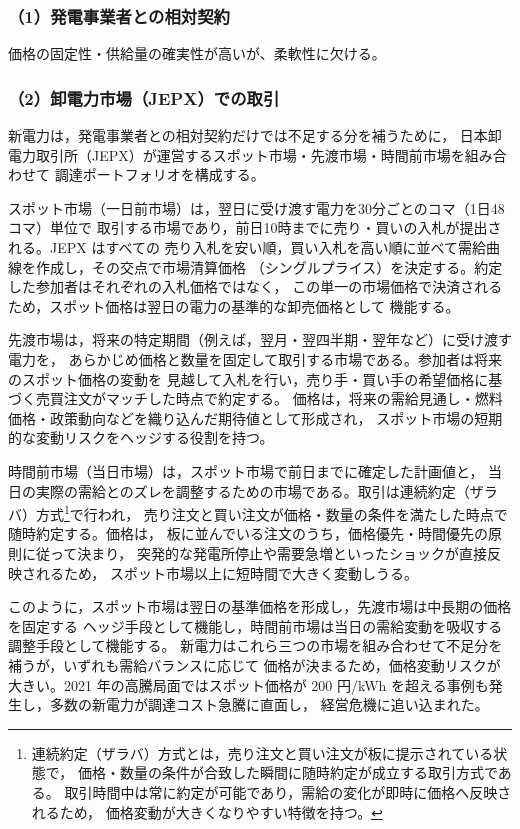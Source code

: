\subsubsection{（1）発電事業者との相対契約}

価格の固定性・供給量の確実性が高いが、柔軟性に欠ける。

\subsubsection{（2）卸電力市場（JEPX）での取引}

新電力は，発電事業者との相対契約だけでは不足する分を補うために，
日本卸電力取引所（JEPX）が運営するスポット市場・先渡市場・時間前市場を組み合わせて
調達ポートフォリオを構成する。

スポット市場（一日前市場）は，翌日に受け渡す電力を30分ごとのコマ（1日48コマ）単位で
取引する市場であり，前日10時までに売り・買いの入札が提出される。JEPX はすべての
売り入札を安い順，買い入札を高い順に並べて需給曲線を作成し，その交点で市場清算価格
（シングルプライス）を決定する。約定した参加者はそれぞれの入札価格ではなく，
この単一の市場価格で決済されるため，スポット価格は翌日の電力の基準的な卸売価格として
機能する。

先渡市場は，将来の特定期間（例えば，翌月・翌四半期・翌年など）に受け渡す電力を，
あらかじめ価格と数量を固定して取引する市場である。参加者は将来のスポット価格の変動を
見越して入札を行い，売り手・買い手の希望価格に基づく売買注文がマッチした時点で約定する。
価格は，将来の需給見通し・燃料価格・政策動向などを織り込んだ期待値として形成され，
スポット市場の短期的な変動リスクをヘッジする役割を持つ。

時間前市場（当日市場）は，スポット市場で前日までに確定した計画値と，
当日の実際の需給とのズレを調整するための市場である。取引は連続約定（ザラバ）方式\footnote{
連続約定（ザラバ）方式とは，売り注文と買い注文が板に提示されている状態で，
価格・数量の条件が合致した瞬間に随時約定が成立する取引方式である。
取引時間中は常に約定が可能であり，需給の変化が即時に価格へ反映されるため，
価格変動が大きくなりやすい特徴を持つ。
}で行われ，
売り注文と買い注文が価格・数量の条件を満たした時点で随時約定する。価格は，
板に並んでいる注文のうち，価格優先・時間優先の原則に従って決まり，
突発的な発電所停止や需要急増といったショックが直接反映されるため，
スポット市場以上に短時間で大きく変動しうる。


このように，スポット市場は翌日の基準価格を形成し，先渡市場は中長期の価格を固定する
ヘッジ手段として機能し，時間前市場は当日の需給変動を吸収する調整手段として機能する。
新電力はこれら三つの市場を組み合わせて不足分を補うが，いずれも需給バランスに応じて
価格が決まるため，価格変動リスクが大きい。2021 年の高騰局面ではスポット価格が
200 円/kWh を超える事例も発生し，多数の新電力が調達コスト急騰に直面し，
経営危機に追い込まれた。

